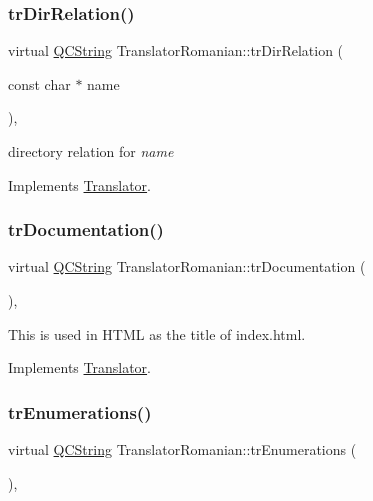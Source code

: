 \subsubsection{\texorpdfstring{trDirRelation()}{trDirRelation()}}
{\footnotesize\ttfamily virtual \mbox{\hyperlink{class_q_c_string}{Q\+C\+String}} Translator\+Romanian\+::tr\+Dir\+Relation (\begin{DoxyParamCaption}\item[{const char $\ast$}]{name }\end{DoxyParamCaption})\hspace{0.3cm}{\ttfamily [inline]}, {\ttfamily [virtual]}}

directory relation for {\itshape name} 

Implements \mbox{\hyperlink{class_translator}{Translator}}.

\mbox{\label{class_translator_romanian_a7bb5f1012f247abdebab6ce9dc3584b6}} 
\subsubsection{\texorpdfstring{trDocumentation()}{trDocumentation()}}
{\footnotesize\ttfamily virtual \mbox{\hyperlink{class_q_c_string}{Q\+C\+String}} Translator\+Romanian\+::tr\+Documentation (\begin{DoxyParamCaption}{ }\end{DoxyParamCaption})\hspace{0.3cm}{\ttfamily [inline]}, {\ttfamily [virtual]}}

This is used in H\+T\+ML as the title of index.\+html. 

Implements \mbox{\hyperlink{class_translator}{Translator}}.

\mbox{\label{class_translator_romanian_a8456264dcdcaf12ec85e5dc9f389c524}} 
\subsubsection{\texorpdfstring{trEnumerations()}{trEnumerations()}}
{\footnotesize\ttfamily virtual \mbox{\hyperlink{class_q_c_string}{Q\+C\+String}} Translator\+Romanian\+::tr\+Enumerations (\begin{DoxyParamCaption}{ }\end{DoxyParamCaption})\hspace{0.3cm}{\ttfamily [inline]}, {\ttfamily [virtual]}}

